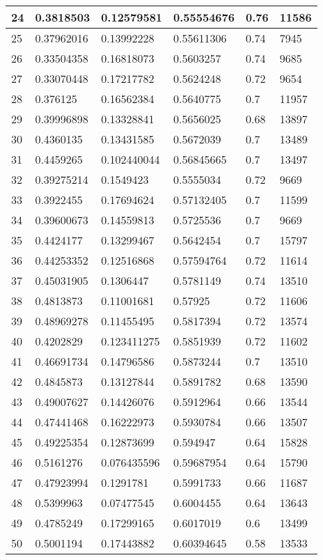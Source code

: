 \begin{longtable}{|l|l|l|l|l|l|}
24 & 0.3818503 & 0.12579581 & 0.55554676 & 0.76 & 11586 \\ \hline 
25 & 0.37962016 & 0.13992228 & 0.55611306 & 0.74 & 7945 \\ \hline 
26 & 0.33504358 & 0.16818073 & 0.5603257 & 0.74 & 9685 \\ \hline 
27 & 0.33070448 & 0.17217782 & 0.5624248 & 0.72 & 9654 \\ \hline 
28 & 0.376125 & 0.16562384 & 0.5640775 & 0.7 & 11957 \\ \hline 
29 & 0.39996898 & 0.13328841 & 0.5656025 & 0.68 & 13897 \\ \hline 
30 & 0.4360135 & 0.13431585 & 0.5672039 & 0.7 & 13489 \\ \hline 
31 & 0.4459265 & 0.102440044 & 0.56845665 & 0.7 & 13497 \\ \hline 
32 & 0.39275214 & 0.1549423 & 0.5555034 & 0.72 & 9669 \\ \hline 
33 & 0.3922455 & 0.17694624 & 0.57132405 & 0.7 & 11599 \\ \hline 
34 & 0.39600673 & 0.14559813 & 0.5725536 & 0.7 & 9669 \\ \hline 
35 & 0.4424177 & 0.13299467 & 0.5642454 & 0.7 & 15797 \\ \hline 
36 & 0.44253352 & 0.12516868 & 0.57594764 & 0.72 & 11614 \\ \hline 
37 & 0.45031905 & 0.1306447 & 0.5781149 & 0.74 & 13510 \\ \hline 
38 & 0.4813873 & 0.11001681 & 0.57925 & 0.72 & 11606 \\ \hline 
39 & 0.48969278 & 0.11455495 & 0.5817394 & 0.72 & 13574 \\ \hline 
40 & 0.4202829 & 0.123411275 & 0.5851939 & 0.72 & 11602 \\ \hline 
41 & 0.46691734 & 0.14796586 & 0.5873244 & 0.7 & 13510 \\ \hline 
42 & 0.4845873 & 0.13127844 & 0.5891782 & 0.68 & 13590 \\ \hline 
43 & 0.49007627 & 0.14426076 & 0.5912964 & 0.66 & 13544 \\ \hline 
44 & 0.47441468 & 0.16222973 & 0.5930784 & 0.66 & 13507 \\ \hline 
45 & 0.49225354 & 0.12873699 & 0.594947 & 0.64 & 15828 \\ \hline 
46 & 0.5161276 & 0.076435596 & 0.59687954 & 0.64 & 15790 \\ \hline 
47 & 0.47923994 & 0.1291781 & 0.5991733 & 0.66 & 11687 \\ \hline 
48 & 0.5399963 & 0.07477545 & 0.6004455 & 0.64 & 13643 \\ \hline 
49 & 0.4785249 & 0.17299165 & 0.6017019 & 0.6 & 13499 \\ \hline 
50 & 0.5001194 & 0.17443882 & 0.60394645 & 0.58 & 13533 \\ \hline 
\end{longtable}